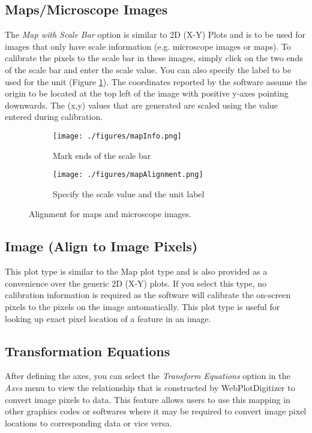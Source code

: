 \documentclass[letterpaper, 10pt]{article}
\begin{document}
\subsection{Maps/Microscope Images}
The \emph{Map with Scale Bar} option is similar to 2D (X-Y) Plots and is to be used for images that only have scale information (e.g. microscope images or maps). To calibrate the pixels to the scale bar in these images, simply click on the two ends of the scale bar and enter the scale value. You can also specify the label to be used for the unit (Figure \ref{fig:mapAlignment}). The coordinates reported by the software assume the origin to be located at the top left of the image with positive y-axes pointing downwards. The (x,y) values that are generated are scaled using the value entered during calibration.

\begin{figure}
\centering
{\begin{subfigure}[b]{0.3\textwidth}
\texttt{[image: ./figures/mapInfo.png]}
\caption{Mark ends of the scale bar}
\end{subfigure}
\begin{subfigure}[b]{0.3\textwidth}
\texttt{[image: ./figures/mapAlignment.png]}
\caption{Specify the scale value and the unit label}
\end{subfigure}}
\caption{Alignment for maps and microscope images.}
\label{fig:mapAlignment}
\end{figure}

\subsection{Image (Align to Image Pixels)}
This plot type is similar to the Map plot type and is also provided as a convenience over the generic 2D (X-Y) plots. If you select this type, no calibration information is required as the software will calibrate the on-screen pixels to the pixels on the image automatically. This plot type is useful for looking up exact pixel location of a feature in an image.

\subsection{Transformation Equations}
After defining the axes, you can select the \emph{Transform Equations} option in the \emph{Axes} menu to view the relationship that is constructed by WebPlotDigitizer to convert image pixels to data. This feature allows users to use this mapping in other graphics codes or softwares where it may be required to convert image pixel locations to corresponding data or vice versa.
\end{document}
